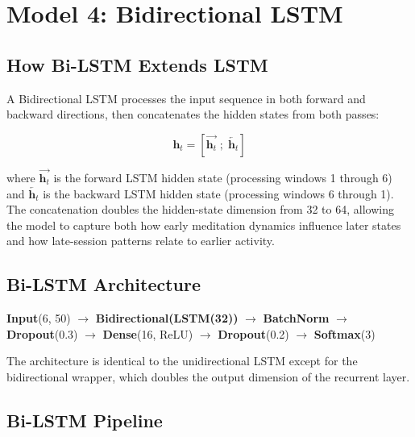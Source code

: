 \documentclass[12pt,a4paper]{article}
\begin{document}
\section{Model 4: Bidirectional LSTM}
\label{sec:bilstm}

\subsection{How Bi-LSTM Extends LSTM}

A Bidirectional LSTM processes the input sequence in both forward and backward directions, then concatenates the hidden states from both passes:

\begin{equation}
\mathbf{h}_t = \left[\overrightarrow{\mathbf{h}_t} \;;\; \overleftarrow{\mathbf{h}_t}\right]
\label{eq:bilstm}
\end{equation}

where $\overrightarrow{\mathbf{h}_t}$ is the forward LSTM hidden state (processing windows 1 through 6) and $\overleftarrow{\mathbf{h}_t}$ is the backward LSTM hidden state (processing windows 6 through 1). The concatenation doubles the hidden-state dimension from 32 to 64, allowing the model to capture both how early meditation dynamics influence later states and how late-session patterns relate to earlier activity.

\subsection{Bi-LSTM Architecture}

\begin{center}
\textbf{Input}(6, 50) $\rightarrow$ \textbf{Bidirectional(LSTM(32))} $\rightarrow$ \textbf{BatchNorm} $\rightarrow$ \textbf{Dropout}(0.3) $\rightarrow$ \textbf{Dense}(16, ReLU) $\rightarrow$ \textbf{Dropout}(0.2) $\rightarrow$ \textbf{Softmax}(3)
\end{center}

The architecture is identical to the unidirectional LSTM except for the bidirectional wrapper, which doubles the output dimension of the recurrent layer.

\subsection{Bi-LSTM Pipeline}
\end{document}
